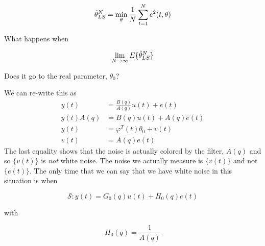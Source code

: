 \begin{equation*}
\hat{\theta}_{LS}^N = \min_\theta \frac{1}{N}\sum_{t=1}^N e^2(t,\theta)
\end{equation*}

What happens when

\begin{equation*}
\lim_{N\to\infty} E\{\hat{\theta}_{LS}^N\}
\end{equation*}

Does it go to the real parameter, $\theta_0$?

We can re-write this as
\begin{align*}
y(t) &= \frac{B(q)}{A(q)}u(t) + e(t) \\
y(t)A(q) &= B(q)u(t) + A(q)e(t) \\
y(t) &= \varphi^T(t)\theta_0 + v(t) \\
v(t) &= A(q)e(t)
\end{align*}
The last equality shows that the noise is actually colored by the filter, $A(q)$ and so $\{v(t)\}$ is \textit{not} white noise.
The noise we actually measure is $\{v(t)\}$ and not $\{e(t)\}$.
The only time that we can say that we have white noise in this situation is when

\begin{equation*}
\mathcal{S}: y(t) = G_0(q)u(t) + H_0(q)e(t)
\end{equation*}

with

\begin{equation*}
H_0(q) = \frac{1}{A(q)}
\end{equation*}
